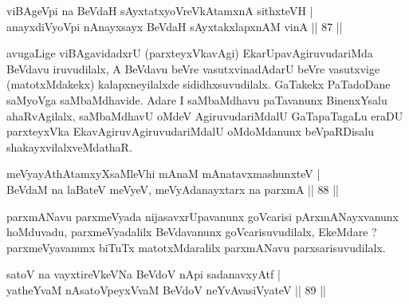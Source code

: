 \begin{shl}
\footnotemark{}viBAgeV\s pi na BeVdaH sAyxtatxyoVreVkAtamxnA sithxteVH  | \\
anayxdiVyoV\s pi nAnayxsayx BeVdaH sAyxtakxlapxnAM vinA \hfill||  87 ||  
\end{shl}

\begin{artha}
avugaLige viBAgavidadxrU (parxteyxVkavAgi) EkarUpavAgiruvudariMda BeVdavu iruvudilalx, A BeVdavu beVre vasutxvinadAdarU beVre vasutxvige (matotxMdakekx) kalapxneyilalxde sididhxsuvudilalx. GaTakekx PaTadoDane saMyoVga saMbaMdhavide. Adare I saMbaMdhavu paTavanunx BinenxYsalu ahaRvAgilalx, saMbaMdhavU oMdeV AgiruvudariMdalU GaTapaTagaLu eraDU parxteyxVka EkavAgiruvAgiruvudariMdalU oMdoMdanunx beVpaRDisalu shakayxvilalxveMdathaR. 
\end{artha}


\begin{shl}
meVyayAthAtamxyXsaMleVhi mAnaM mAnatavxmashunxteV  | \\
BeVdaM na laBateV meVyeV, meVyAdanayxtarx na parxmA \hfill||  88 ||  
\end{shl}

\begin{artha}
parxmANavu parxmeVyada nijasavxrUpavanunx goVcarisi pArxmANayxvanunx hoMduvadu, parxmeVyadalilx BeVdavanunx goVcarisuvudilalx, EkeMdare ? parxmeVyavanunx biTuTx matotxMdaralilx parxmANavu parxsarisuvudilalx.
\end{artha}

\begin{shl}
\footnotemark{}satoV na vayxtireVkeVNa BeVdoV nApi sadanavxyAtf  | \\
yatheYvaM nAsatoV\s peyxVvaM BeVdoV neYvAvasiVyateV \hfill||  89 ||  
\end{shl}


